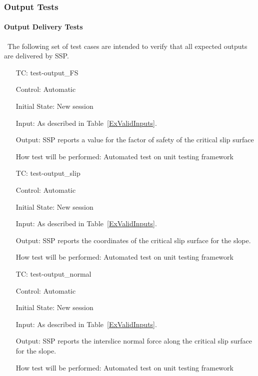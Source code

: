 \documentclass[12pt, titlepage]{article}
\newcounter{testnum} %
\newcommand{\progname}{SSP}
\begin{document}
\subsubsection{Output Tests}

\paragraph{Output Delivery Tests}

~\newline \noindent The following set of test cases are intended to 
verify that all expected outputs are delivered by \progname{}.

\begin{enumerate}[label=TC\arabic*:,ref={\arabic*}]
	
\item [TC\refstepcounter{testnum}\thetestnum: \label{TC_OutFS}] 
test-output\_FS

Control: Automatic

Initial State: New session

Input: As described in Table~\ref{ExValidInputs}.

Output: \progname{} reports a value for the factor of safety of the critical 
slip surface

How test will be performed: Automated test on unit testing framework

\item [TC\refstepcounter{testnum}\thetestnum: \label{TC_OutSlip}] 
test-output\_slip

Control: Automatic

Initial State: New session

Input: As described in Table~\ref{ExValidInputs}.

Output: \progname{} reports the coordinates of the critical slip surface for 
the slope.

How test will be performed: Automated test on unit testing framework

\item [TC\refstepcounter{testnum}\thetestnum: \label{TC_OutNormal}] 
test-output\_normal

Control: Automatic

Initial State: New session

Input: As described in Table~\ref{ExValidInputs}.

Output: \progname{} reports the interslice normal force along the critical slip 
surface for the slope.

How test will be performed: Automated test on unit testing framework


\end{enumerate}
\end{document}
